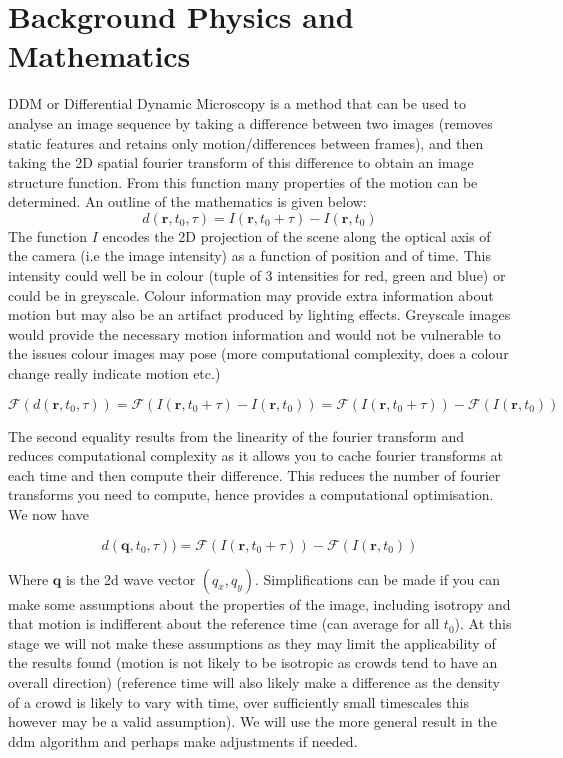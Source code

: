 \documentclass[11pt]{article}
\begin{document}
\section{Background Physics and Mathematics}
DDM or Differential Dynamic Microscopy is a method that can be used to analyse an image sequence by taking a difference between two images (removes static features and retains only motion/differences between frames),
and then taking the 2D spatial fourier transform of this difference to obtain an image structure function.
From this function many properties of the motion can be determined.\cite{ddm1}
An outline of the mathematics is given below:
\\
\begin{equation}
    d(\textbf{r}, t_0, \tau) = I(\mathbf{r}, t_0 + \tau) - I(\mathbf{r}, t_0)
\end{equation}
The function $\textit{I}$ encodes the 2D projection of the scene along the optical axis of the camera (i.e the image intensity) as a function of position and of time.
This intensity could well be in colour (tuple of 3 intensities for red, green and blue) or could be in greyscale.
Colour information may provide extra information about motion but may also be an artifact produced by lighting effects.
Greyscale images would provide the necessary motion information and would not be vulnerable to the issues colour images may pose (more computational complexity, does a colour change really indicate motion etc.)

\begin{equation}
    \mathscr{F} ( d(\textbf{r}, t_0, \tau) ) = \mathscr{F} (I(\mathbf{r}, t_0 + \tau) - I(\mathbf{r}, t_0)) = \mathscr{F}(I(\mathbf{r}, t_0 + \tau)) - \mathscr{F}(I(\mathbf{r}, t_0))
\end{equation}

The second equality results from the linearity of the fourier transform and reduces computational complexity as it allows you to cache fourier transforms at each time and then compute their difference.
This reduces the number of fourier transforms you need to compute, hence provides a computational optimisation.\cite{ddm2}
We now have

\begin{equation}
    d(\textbf{q}, t_0, \tau) ) = \mathscr{F}(I(\mathbf{r}, t_0 + \tau)) - \mathscr{F}(I(\mathbf{r}, t_0))
\end{equation}

Where $\textbf{q}$ is the 2d wave vector $(q_x, q_y)$.
Simplifications can be made if you can make some assumptions about the properties of the image, including isotropy and that motion is indifferent about the reference time (can average for all $t_0$).\cite{ddm1}
At this stage we will not make these assumptions as they may limit the applicability of the results found (motion is not likely to be isotropic as crowds tend to have an overall direction)
(reference time will also likely make a difference as the density of a crowd is likely to vary with time, over sufficiently small timescales this however may be a valid assumption).
We will use the more general result in the ddm algorithm and perhaps make adjustments if needed.
\end{document}
